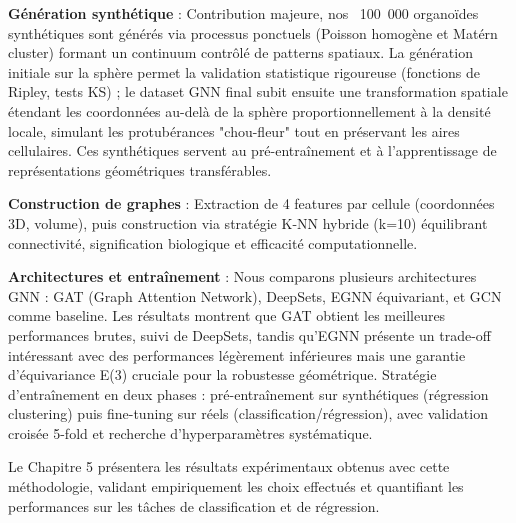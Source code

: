 \textbf{Génération synthétique} : Contribution majeure, nos ~100~000 organoïdes synthétiques sont générés via processus ponctuels (Poisson homogène et Matérn cluster) formant un continuum contrôlé de patterns spatiaux. La génération initiale sur la sphère permet la validation statistique rigoureuse (fonctions de Ripley, tests KS) ; le dataset GNN final subit ensuite une transformation spatiale étendant les coordonnées au-delà de la sphère proportionnellement à la densité locale, simulant les protubérances "chou-fleur" tout en préservant les aires cellulaires. Ces synthétiques servent au pré-entraînement et à l'apprentissage de représentations géométriques transférables.

\textbf{Construction de graphes} : Extraction de 4 features par cellule (coordonnées 3D, volume), puis construction via stratégie K-NN hybride (k=10) équilibrant connectivité, signification biologique et efficacité computationnelle.

\textbf{Architectures et entraînement} : Nous comparons plusieurs architectures GNN : GAT (Graph Attention Network), DeepSets, EGNN équivariant, et GCN comme baseline. Les résultats montrent que GAT obtient les meilleures performances brutes, suivi de DeepSets, tandis qu'EGNN présente un trade-off intéressant avec des performances légèrement inférieures mais une garantie d'équivariance E(3) cruciale pour la robustesse géométrique. Stratégie d'entraînement en deux phases : pré-entraînement sur synthétiques (régression clustering) puis fine-tuning sur réels (classification/régression), avec validation croisée 5-fold et recherche d'hyperparamètres systématique.

Le Chapitre 5 présentera les résultats expérimentaux obtenus avec cette méthodologie, validant empiriquement les choix effectués et quantifiant les performances sur les tâches de classification et de régression.
